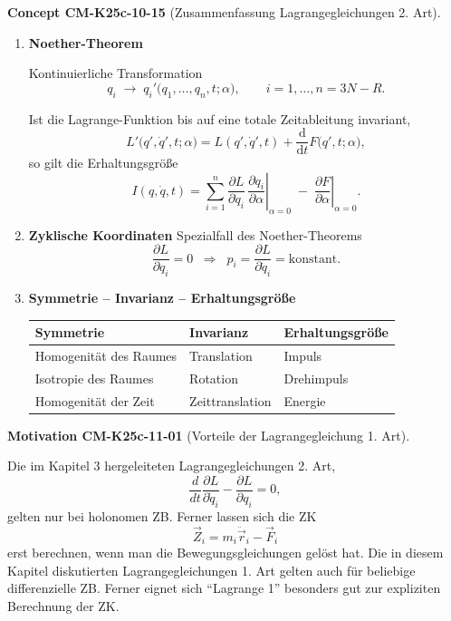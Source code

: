 \documentclass[10pt, letterpaper]{article}
\newcommand{\CustomHeading}[3]{%
  \par\medskip\noindent%
  \textbf{#1 #2} \textnormal{(#3)}.\enskip%
}
\newenvironment{CONC}[2]{\CustomHeading{Concept}{#1}{#2}}{}
\newenvironment{MOT}[2]{\CustomHeading{Motivation}{#1}{#2}}{}
\begin{document}
\begin{CONC}{CM-K25c-10-15}{Zusammenfassung Lagrangegleichungen 2. Art}
\begin{enumerate}
  \item \textbf{Noether-Theorem}

        Kontinuierliche Transformation
        \[
          q_i \;\longrightarrow\;
          q_i'\bigl(q_1,\dots,q_n,t;\alpha\bigr),
          \qquad i=1,\dots,n=3N-R.
        \]

        Ist die Lagrange-Funktion bis auf eine totale Zeitableitung invariant,
        \[
          L'\bigl(q',\dot q',t;\alpha\bigr)
          = L(q',\dot q',t)
            +\frac{\mathrm d}{\mathrm dt}F\bigl(q',t;\alpha\bigr),
        \]
        so gilt die Erhaltungsgröße
        \[
          I(q,\dot q,t)
          = \sum_{i=1}^{n}
              \frac{\partial L}{\partial\dot q_i}\,
              \left.
                \frac{\partial q_i}{\partial\alpha}
              \right|_{\alpha=0}
            \;-\;
            \left.
              \frac{\partial F}{\partial\alpha}
            \right|_{\alpha=0}.
        \]

  \item \textbf{Zyklische Koordinaten}  
        Spezialfall des Noether-Theorems  
        \[
          \frac{\partial L}{\partial q_i}=0
          \;\;\Longrightarrow\;\;
          p_i=\frac{\partial L}{\partial\dot q_i}
          =\text{konstant}.
        \]

  \item \textbf{Symmetrie – Invarianz – Erhaltungsgröße}

        \begin{center}
        \begin{tabular}{|l|l|l|}
          \hline
          \textbf{Symmetrie} & \textbf{Invarianz} & \textbf{Erhaltungsgröße} \\ \hline
          Homogenität des Raumes        & Translation & Impuls \\ \hline
          Isotropie des Raumes          & Rotation    & Drehimpuls \\ \hline
          Homogenität der Zeit          & Zeittranslation & Energie \\ \hline
        \end{tabular}
        \end{center}
\end{enumerate}
\end{CONC}

\begin{MOT}{CM-K25c-11-01}{Vorteile der Lagrangegleichung 1. Art}
Die im Kapitel 3 hergeleiteten Lagrangegleichungen 2. Art,
\[\frac{d}{dt}\frac{\partial L}{\partial \dot{q}_i} - \frac{\partial L}{\partial q_i} = 0,\]
gelten nur bei holonomen ZB. Ferner lassen sich die ZK
\[\vec{Z}_i = m_i\ddot{\vec{r}}_i-\vec{F}_i\] erst berechnen, wenn man die Bewegungsgleichungen gelöst hat. Die in diesem Kapitel diskutierten Lagrangegleichungen 1. Art gelten auch für beliebige differenzielle ZB. Ferner eignet sich ``Lagrange 1'' besonders gut zur expliziten Berechnung der ZK.
\end{MOT}
\end{document}
